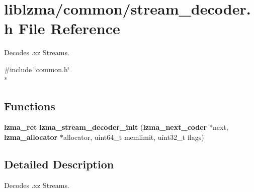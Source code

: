 \section{liblzma/common/stream\-\_\-decoder.h File Reference}
\label{stream__decoder_8h}


Decodes .xz Streams.  


{\ttfamily \#include \char`\"{}common.\-h\char`\"{}}\\*
\subsection*{Functions}
\begin{DoxyCompactItemize}
\item 
{\bf lzma\-\_\-ret} {\bfseries lzma\-\_\-stream\-\_\-decoder\-\_\-init} ({\bf lzma\-\_\-next\-\_\-coder} $\ast$next, {\bf lzma\-\_\-allocator} $\ast$allocator, uint64\-\_\-t memlimit, uint32\-\_\-t flags)\label{stream__decoder_8h_a3d14b0018ff9d4ff14b2a14966e90500}

\end{DoxyCompactItemize}


\subsection{Detailed Description}
Decodes .xz Streams. 
